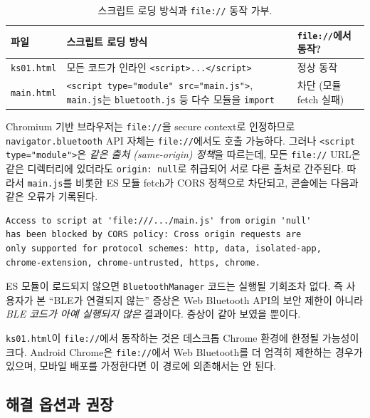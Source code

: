 \documentclass[11pt, oneside]{article}
\begin{document}
\begin{table}[h]
\centering
\small
\begin{tabularx}{\linewidth}{@{}lXX@{}}
\toprule
파일 & 스크립트 로딩 방식 & \texttt{file://}에서 동작? \\
\midrule
\texttt{ks01.html} & 모든 코드가 인라인 \texttt{<script>...</script>} & 정상 동작 \\
\texttt{main.html} & \texttt{<script type="module" src="main.js">}, \texttt{main.js}는 \texttt{bluetooth.js} 등 다수 모듈을 \texttt{import} & 차단 (모듈 fetch 실패) \\
\bottomrule
\end{tabularx}
\caption{스크립트 로딩 방식과 \texttt{file://} 동작 가부.}
\end{table}

Chromium 기반 브라우저는 \texttt{file://}을 secure context로 인정하므로
\texttt{navigator.bluetooth} API 자체는 \texttt{file://}에서도 호출
가능하다. 그러나 \texttt{<script type="module">}은 \emph{같은 출처
(same-origin) 정책}을 따르는데, 모든 \texttt{file://} URL은 같은
디렉터리에 있더라도 \texttt{origin: null}로 취급되어 서로 다른 출처로
간주된다. 따라서 \texttt{main.js}를 비롯한 ES 모듈 fetch가 CORS
정책으로 차단되고, 콘솔에는 다음과 같은 오류가 기록된다.

\begin{verbatim}
Access to script at 'file:///.../main.js' from origin 'null'
has been blocked by CORS policy: Cross origin requests are
only supported for protocol schemes: http, data, isolated-app,
chrome-extension, chrome-untrusted, https, chrome.
\end{verbatim}

ES 모듈이 로드되지 않으면 \texttt{BluetoothManager} 코드는 실행될
기회조차 없다. 즉 사용자가 본 ``BLE가 연결되지 않는'' 증상은 Web
Bluetooth API의 보안 제한이 아니라 \emph{BLE 코드가 아예 실행되지
않은} 결과이다. 증상이 같아 보였을 뿐이다.

\begin{caution}
\texttt{ks01.html}이 \texttt{file://}에서 동작하는 것은 데스크톱 Chrome
환경에 한정될 가능성이 크다. Android Chrome은 \texttt{file://}에서 Web
Bluetooth를 더 엄격히 제한하는 경우가 있으며, 모바일 배포를 가정한다면
이 경로에 의존해서는 안 된다.
\end{caution}

\subsection{해결 옵션과 권장}
\end{document}
